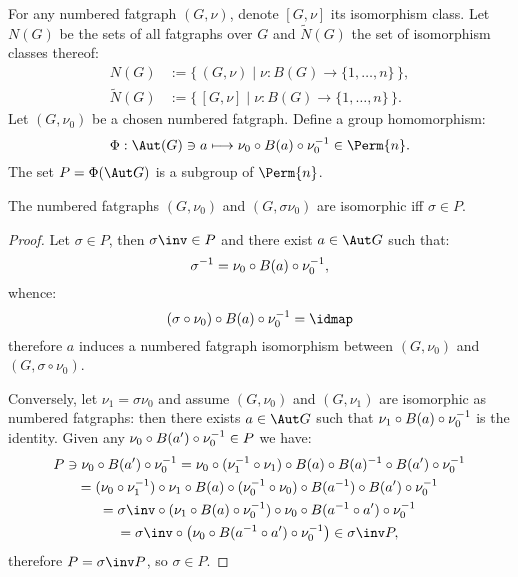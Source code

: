 For any numbered fatgraph $(G, \nu)$, denote $[G, \nu]$ its
isomorphism class.  Let $N(G)$ be the sets of all fatgraphs over $G$
and $\tilde N(G)$ the set of isomorphism classes thereof:
\begin{align*}
  N(G) &:= \{\, (G,\nu) \;|\; \nu\colon B(G) \to \{1,\ldots,n\} \,\},
  \\
  \tilde N(G) &:= \{\, [G,\nu] \;|\; \nu\colon B(G) \to \{1,\ldots,n\} \,\}.
\end{align*}
Let $(G, \nu_0)$ be a chosen numbered fatgraph.  Define a group
homomorphism:
\begin{equation}\label{eq:Phi}
\Phi: \Aut(G) \ni a \longmapsto \nu_0 \circ \Holes{a} \circ
\nu_0^{-1} \in \Perm{n}.
\end{equation}
The set $P = \Phi(\Aut G)$ is a subgroup of $\Perm{n}$.
\begin{lemma}\label{lemma:sigma}
  The numbered fatgraphs $(G, \nu_0)$ and $(G, \sigma\nu_0)$ are
  isomorphic iff $\sigma \in P$.
\end{lemma}
\begin{proof}
  Let $\sigma \in P$, then $\sigma\inv \in P$ and there
  exist $a \in \Aut G$ such that:
  \begin{equation*}
    \sigma^{-1} = \nu_0 \circ B(a) \circ \nu_0^{-1},
  \end{equation*}
  whence:
  \begin{equation*}
    (\sigma \circ \nu_0) \circ \Holes{a} \circ \nu_0^{-1} = \idmap
  \end{equation*}
  therefore $a$ induces a numbered fatgraph isomorphism
  between $(G, \nu_0)$ and $(G, \sigma \circ \nu_0)$.

  Conversely, let $\nu_1 = \sigma\nu_0$ and assume $(G, \nu_0)$ and
  $(G, \nu_1)$ are isomorphic as numbered fatgraphs: then there exists
  $a \in \Aut G$ such that $\nu_1 \circ B(a) \circ \nu_0^{-1}$ is
  the identity. Given any $\nu_0 \circ B(a') \circ \nu_0^{-1} \in
  P$ we have:
  \begin{multline*}
    P \ni \nu_0 \circ \Holes{a'} \circ \nu_0^{-1} 
    = \nu_0 \circ (\nu_1^{-1} \circ \nu_1) 
      \circ \Holes{a} \circ \Holes{a}^{-1}
      \circ \Holes{a'} \circ \nu_0^{-1} 
    \\
    = (\nu_0 \circ \nu_1^{-1}) \circ \nu_1 \circ \Holes{a}
      \circ (\nu_0^{-1} \circ \nu_0) \circ \Holes{a^{-1}} 
      \circ \Holes{a'} \circ \nu_0^{-1} 
    \\
    = \sigma\inv \circ (\nu_1 \circ
      \Holes{a} \circ \nu_0^{-1}) \circ \nu_0 \circ \Holes{a^{-1} \circ
      a'} \circ \nu_0^{-1}
    \\
    = \sigma\inv \circ \left( \nu_0 \circ
      \Holes{a^{-1} \circ a'} \circ \nu_0^{-1} \right)
    \in \sigma\inv P,
  \end{multline*}
  therefore $P = \sigma\inv P$, so $\sigma \in P$.
\end{proof}

